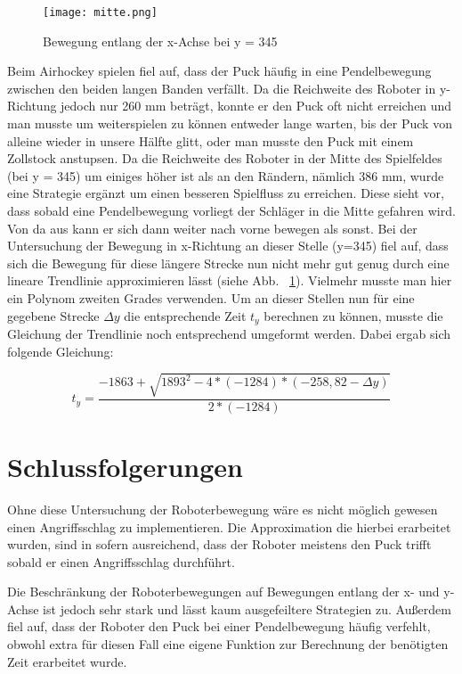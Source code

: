 \begin{figure}[htbp]
\centering
\texttt{[image: mitte.png]}
\caption{Bewegung entlang der x-Achse bei y = 345} 
\label{mitte}
\end{figure}
  
Beim Airhockey spielen fiel auf, dass der Puck häufig in eine Pendelbewegung zwischen den beiden langen Banden verfällt. Da die Reichweite des Roboter in y-Richtung jedoch nur 260 mm beträgt, konnte er den Puck oft nicht erreichen und man musste um weiterspielen zu können entweder lange warten, bis der Puck von alleine wieder in unsere Hälfte glitt, oder man musste den Puck mit einem Zollstock anstupsen. 
Da die Reichweite des Roboter in der Mitte des Spielfeldes (bei y = 345) um einiges höher ist als an den Rändern, nämlich 386 mm, wurde eine Strategie ergänzt um einen besseren Spielfluss zu erreichen. Diese sieht vor, dass sobald eine Pendelbewegung vorliegt der Schläger in die Mitte gefahren wird. Von da aus kann er sich dann weiter nach vorne bewegen als sonst. 
Bei der Untersuchung der Bewegung in x-Richtung an dieser Stelle (y=345) fiel auf, dass sich die Bewegung für diese längere Strecke nun nicht mehr gut genug durch eine lineare Trendlinie approximieren lässt (siehe Abb. ~\ref{mitte}). Vielmehr musste man hier ein Polynom zweiten Grades verwenden. Um an dieser Stellen nun für eine gegebene Strecke $ \Delta y $ die entsprechende Zeit $ t_y $ berechnen zu können, musste die Gleichung der Trendlinie noch entsprechend umgeformt werden. Dabei ergab sich folgende Gleichung:

\begin{equation}
t_y = \dfrac{-1863+\sqrt{1893^2-4*(-1284)*(-258,82-\Delta y)}}{2*(-1284)}
\end{equation} 

\section{Schlussfolgerungen}
Ohne diese Untersuchung der Roboterbewegung wäre es nicht möglich gewesen einen Angriffsschlag zu implementieren. Die Approximation die hierbei erarbeitet wurden, sind in sofern ausreichend, dass der Roboter meistens den Puck trifft sobald er einen Angriffsschlag durchführt. 

Die Beschränkung der Roboterbewegungen auf Bewegungen entlang der x- und y-Achse ist jedoch sehr stark und lässt kaum ausgefeiltere Strategien zu. Außerdem fiel auf, dass der Roboter den Puck bei einer Pendelbewegung häufig verfehlt, obwohl extra für diesen Fall eine eigene Funktion zur Berechnung der benötigten Zeit erarbeitet wurde. 

